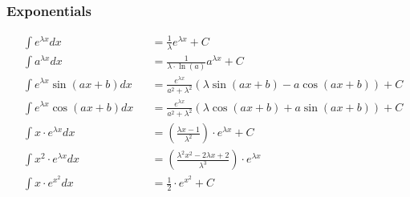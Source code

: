 \subsubsection{Exponentials}
\begin{footnotesize}
    \noindent\begin{align*}
         & \int e^{\lambda x}dx           &  & =\frac{1}{\lambda }e^{\lambda x}+C                                                 \\
         & \int a^{\lambda x}dx           &  & =\frac{1}{\lambda \cdot \ln(a)}a^{\lambda x}+C                                     \\
         & \int e^{\lambda x}\sin(ax+b)dx &  & =\frac{e^{\lambda x}}{a^2+\lambda ^2}\left(\lambda \sin(ax+b)-a\cos(ax+b)\right)+C \\
         & \int e^{\lambda x}\cos(ax+b)dx &  & =\frac{e^{\lambda x}}{a^2+\lambda ^2}\left(\lambda \cos(ax+b)+a\sin(ax+b)\right)+C \\
         & \int x \cdot e^{\lambda x}dx   &  & =(\frac{\lambda x-1}{\lambda ^2})\cdot e^{\lambda x}+C                             \\
         & \int x^2 \cdot e^{\lambda x}dx &  & =(\frac{\lambda ^2x^2-2\lambda x+2}{\lambda ^3})\cdot e^{\lambda x}                \\
         & \int x\cdot e^{x^2}dx          &  & =\frac{1}{2}\cdot e^{x^2}+C
    \end{align*}
\end{footnotesize}


